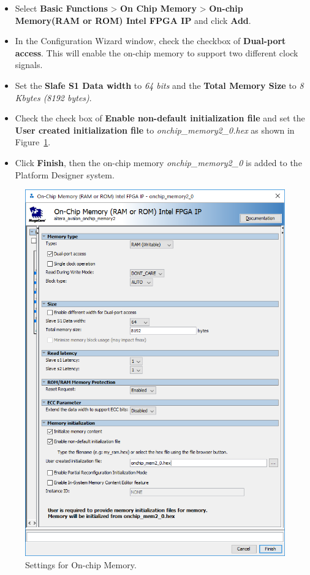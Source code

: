 \documentclass[11pt, twoside, pdftex]{article}
\begin{document}
\begin{itemize}
	\item Select {\bf Basic Functions} > {\bf On Chip Memory} > {\bf On-chip Memory(RAM or ROM) Intel FPGA IP} and click {\bf Add}.
	\item In the Configuration Wizard window, check the checkbox of {\bf Dual-port access}. This will enable the on-chip memory to support two different clock signals. 
	\item Set the {\bf Slafe S1 Data width} to {\it 64 bits} and the {\bf Total Memory Size} to {\it 8 Kbytes (8192 bytes)}.
	\item Check the check box of {\bf Enable non-default initialization file} and set the {\bf User created initialization file} to {\it onchip\_memory2\_0.hex} as shown in Figure~\ref{fig:onchip_mem_settings}.
	\item Click {\bf Finish}, then the on-chip memory {\it onchip\_memory2\_0} is added to the Platform Designer system.
\end{itemize}

\begin{figure}[H]
	\centering
	  \includegraphics[scale=0.55]{figures/onchip_mem_settings.png}
	\caption{Settings for On-chip Memory.} 
	\label{fig:onchip_mem_settings}
\end{figure}
\end{document}
